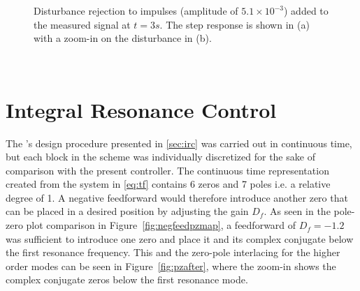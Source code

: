 \begin{figure}[h!]
  \centering %
  \qquad
  \caption{\label{fig:distmeasrejection} Disturbance rejection to impulses (amplitude of $5.1 \times 10^{-3}$) added to the measured signal at $t=3s$. The step response is shown in (a)  with a zoom-in on the disturbance in (b).}
\end{figure}

\newpage~\newpage
\FloatBarrier
\section{Integral Resonance Control}
The \abbrIRC's design procedure presented in \ref{sec:irc} was carried out in continuous time, but each block in the scheme was individually discretized for the sake of comparison with the present controller. The continuous time representation created from the system in \eqref{eq:tf} contains 6 zeros and 7 poles i.e. a relative degree of 1. A negative feedforward would therefore introduce another zero that can be placed in a desired position by adjusting the gain $D_f$. As seen in the pole-zero plot comparison in Figure~\ref{fig:negfeedpzmap}, a feedforward of $D_f=-1.2$ was sufficient to introduce one zero and place it and its complex conjugate below the first resonance frequency. This and the zero-pole interlacing for the higher order modes can be seen in Figure~\ref{fig:pzafter}, where the zoom-in shows the complex conjugate zeros below the first resonance mode.

